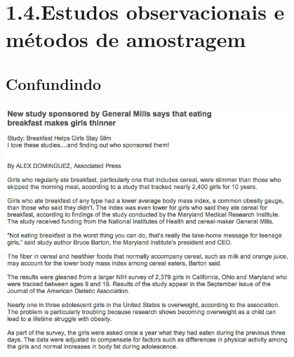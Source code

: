 
\section{1.4.Estudos observacionais e métodos de amostragem}


\subsection{Confundindo}


\begin{frame}
\frametitle{}

\begin{center}
\includegraphics[width=0.80\textwidth]{1-4_obs_studies_sampling/figures/breakfast/breakfast1.png}
\end{center}

{\tiny {}}

\end{frame}

